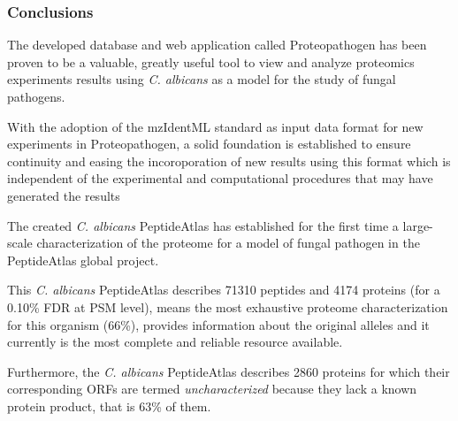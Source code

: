 \newpage

\subsubsection*{Conclusions}

The developed database and web application called Proteopathogen has been proven to be a
valuable, greatly useful tool to view and analyze proteomics experiments 
results using \textit{C. albicans} as a model for the study of fungal pathogens.

With the adoption of the mzIdentML standard as input data format for new experiments
in Proteopathogen, a solid foundation is established to ensure continuity and easing
the incoroporation of new results using this format which is independent of the
experimental and computational procedures that may have generated the results

The created \textit{C. albicans} PeptideAtlas has established for the first time
a large-scale characterization of the proteome for a model of fungal pathogen
in the PeptideAtlas global project.


This \textit{C. albicans} PeptideAtlas describes 71310 peptides and 4174 proteins
(for a 0.10\% FDR at PSM level), means the most exhaustive proteome characterization
for this organism (66\%), provides information about the original alleles
and it currently is the most complete and reliable resource available.

Furthermore, the \textit{C. albicans} PeptideAtlas describes 2860 proteins
for which their corresponding ORFs are termed \textit{uncharacterized} because
they lack a known protein product, that is 63\% of them.

\endinput
